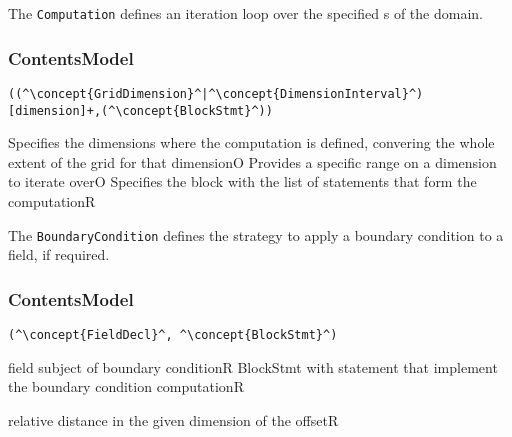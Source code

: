 The {\tt Computation} defines an iteration loop over the specified s of the domain. 

\subsubsection*{ContentsModel}{}

\begin{lstlisting}[style=default]
((^\concept{GridDimension}^|^\concept{DimensionInterval}^)[dimension]+,(^\concept{BlockStmt}^))
\end{lstlisting}

\begin{HIRChildElements}
	{Specifies the dimensions where the computation is defined, 
		convering the whole extent of the grid for that dimension}{O}
	{Provides a specific range on a dimension to iterate over}{O}
	{Specifies the block with the list of statements that form the computation}{R}
\end{HIRChildElements}


The {\tt BoundaryCondition} defines the strategy to apply a boundary condition to a field, if required.

\subsubsection*{ContentsModel}{}

\begin{lstlisting}[style=default]
(^\concept{FieldDecl}^, ^\concept{BlockStmt}^)
\end{lstlisting}

\begin{HIRChildElements}
	{field subject of boundary condition}{R}
	{BlockStmt with statement that implement the boundary condition computation}{R}
		
\end{HIRChildElements}

\begin{HIRAttributes}
	{relative distance in the given dimension of the offset}{R}
\end{HIRAttributes}
